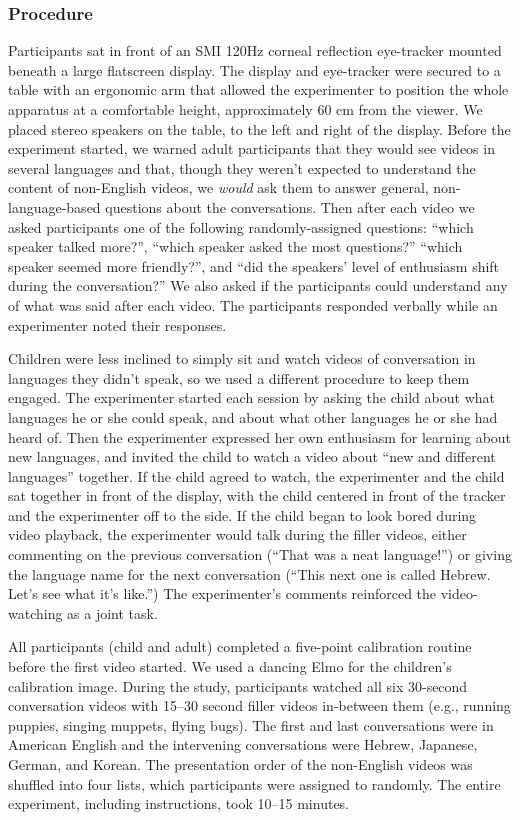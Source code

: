 \documentclass[authoryear, 12pt]{elsarticle}
\begin{document}
\subsubsection{Procedure} 
Participants sat in front of an SMI 120Hz corneal reflection eye-tracker mounted beneath a large flatscreen display. The display and eye-tracker were secured to a table with an ergonomic arm that allowed the experimenter to position the whole apparatus at a comfortable height, approximately 60 cm from the viewer. We placed stereo speakers on the table, to the left and right of the display. Before the experiment started, we warned adult participants that they would see videos in several languages and that, though they weren't expected to understand the content of non-English videos, we \textit{would} ask them to answer general, non-language-based questions about the conversations. Then after each video we asked participants one of the following randomly-assigned questions: ``which speaker talked more?'', ``which speaker asked the most questions?'' ``which speaker seemed more friendly?'', and ``did the speakers' level of enthusiasm shift during the conversation?'' We also asked if the participants could understand any of what was said after each video. The participants responded verbally while an experimenter noted their responses.

Children were less inclined to simply sit and watch videos of conversation in languages they didn't speak, so we used a different procedure to keep them engaged. The experimenter started each session by asking the child about what languages he or she could speak, and about what other languages he or she had heard of. Then the experimenter expressed her own enthusiasm for learning about new languages, and invited the child to watch a video about ``new and different languages'' together. If the child agreed to watch, the experimenter and the child sat together in front of the display, with the child centered in front of the tracker and the experimenter off to the side. If the child began to look bored during video playback, the experimenter would talk during the filler videos, either commenting on the previous conversation (``That was a neat language!'') or giving the language name for the next conversation (``This next one is called Hebrew. Let's see what it's like.'') The experimenter's comments reinforced the video-watching as a joint task.

All participants (child and adult) completed a five-point calibration routine before the first video started. We used a dancing Elmo for the children's calibration image. During the study, participants watched all six 30-second conversation videos with 15--30 second filler videos in-between them (e.g., running puppies, singing muppets, flying bugs). The first and last conversations were in American English and the intervening conversations were Hebrew, Japanese, German, and Korean. The presentation order of the non-English videos was shuffled into four lists, which participants were assigned to randomly. The entire experiment, including instructions, took 10--15 minutes.
\end{document}
